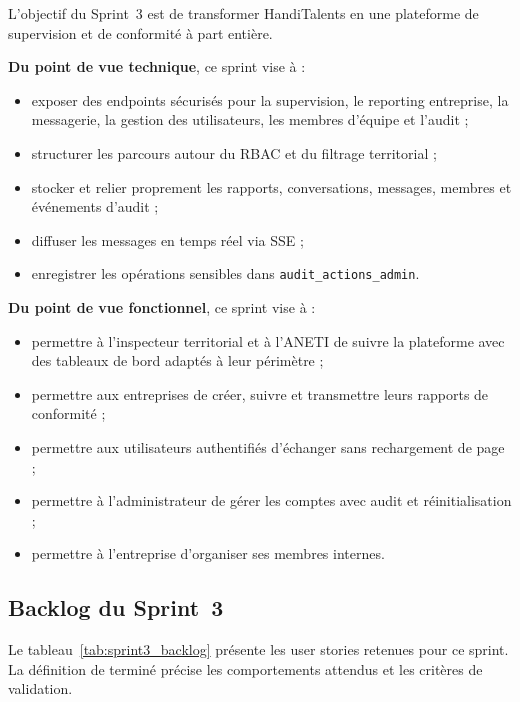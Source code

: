 \documentclass[12pt,a4paper]{report}
\begin{document}
L'objectif du Sprint~3 est de transformer HandiTalents en une plateforme de supervision
et de conformité à part entière.

\textbf{Du point de vue technique}, ce sprint vise à :
\begin{itemize}
  \item exposer des endpoints sécurisés pour la supervision, le reporting entreprise,
  la messagerie, la gestion des utilisateurs, les membres d'équipe et l'audit ;
  \item structurer les parcours autour du RBAC et du filtrage territorial ;
  \item stocker et relier proprement les rapports, conversations, messages, membres et
  événements d'audit ;
  \item diffuser les messages en temps réel via SSE ;
  \item enregistrer les opérations sensibles dans \texttt{audit\_actions\_admin}.
\end{itemize}

\textbf{Du point de vue fonctionnel}, ce sprint vise à :
\begin{itemize}
  \item permettre à l'inspecteur territorial et à l'ANETI de suivre la plateforme avec
  des tableaux de bord adaptés à leur périmètre ;
  \item permettre aux entreprises de créer, suivre et transmettre leurs rapports de
  conformité ;
  \item permettre aux utilisateurs authentifiés d'échanger sans rechargement de page ;
  \item permettre à l'administrateur de gérer les comptes avec audit et réinitialisation ;
  \item permettre à l'entreprise d'organiser ses membres internes.
\end{itemize}

\subsection{Backlog du Sprint~3}

Le tableau~\ref{tab:sprint3_backlog} présente les user stories retenues pour ce sprint.
La définition de terminé précise les comportements attendus et les critères de validation.
\end{document}
